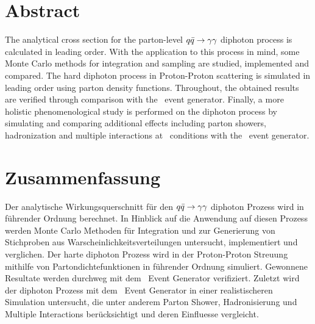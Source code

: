 \section*{Abstract}

The analytical cross section for the parton-level \(q\bar{q}\rightarrow\gamma\gamma\) diphoton
process is calculated in leading order. With the application to this
process in mind, some Monte Carlo methods for integration and sampling
are studied, implemented and compared. The hard diphoton process in
Proton-Proton scattering is simulated in leading order using parton
density functions. Throughout, the obtained results are verified
through comparison with the \sherpa\ event generator. Finally, a more
holistic phenomenological study is performed on the diphoton process
by simulating and comparing additional effects including parton
showers, hadronization and multiple interactions at \lhc\ conditions
with the \sherpa\ event generator.


\section*{Zusammenfassung}

Der analytische Wirkungsquerschnitt f\"ur den \(q\bar{q}\rightarrow\gamma\gamma\) diphoton
Prozess wird in f\"uhrender Ordnung berechnet. In Hinblick auf die
Anwendung auf diesen Prozess werden Monte Carlo Methoden f\"ur
Integration und zur Generierung von Stichproben aus
Warscheinlichkeitsverteilungen untersucht, implementiert und
verglichen. Der harte diphoton Prozess wird in der Proton-Proton
Streuung mithilfe von Partondichtefunktionen in f\"uhrender Ordnung
simuliert. Gewonnene Resultate werden durchweg mit dem \sherpa\ Event
Generator verifiziert. Zuletzt wird der diphoton Prozess mit dem
\sherpa\ Event Generator in einer realistischeren Simulation
untersucht, die unter anderem Parton Shower, Hadronisierung und
Multiple Interactions ber\"ucksichtigt und deren Einfluesse
vergleicht.

